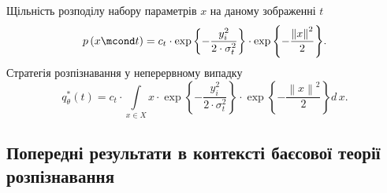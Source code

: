 Щільність розподілу набору параметрів $x$ на даному зображенні $t$
\begin{equation*}
  p\left( x \mcond t \right)
  = c_t
    \cdot \exp{\left\{ - \frac{y_i^2}{2 \cdot \sigma_t^2} \right\}}
    \cdot \exp{\left\{ - \frac{\left\| x \right\|^2}{2} \right\}}.
\end{equation*}
Стратегія розпізнавання у неперервному випадку
\begin{equation*}
  q^*_{\theta}\left( t \right)
  = c_t
    \cdot \int\limits_{x \in X}
      x
      \cdot \exp{\left\{ - \frac{y_i^2}{2 \cdot \sigma_t^2} \right\}}
      \cdot \exp{\left\{ - \frac{\left\| x \right\|^2}{2} \right\}}
    d\,x.
\end{equation*}

\subsection{Попередні результати в контексті баєсової теорії розпізнавання}

